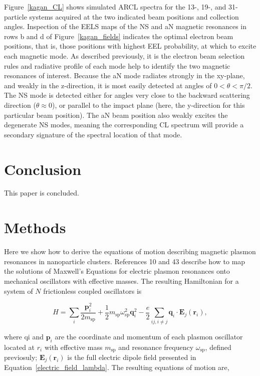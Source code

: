 \documentclass[journal=apchd5,manuscript=article]{achemso}
\begin{document}
Figure~\ref{kagan_CL} shows simulated ARCL spectra for the 13-, 19-, and 31-particle systems acquired at the two indicated beam positions and collection angles. Inspection of the EELS maps of the NS and aN magnetic resonances in rows b and d of Figure~\ref{kagan_fields} indicates the optimal electron beam positions, that is, those positions with highest EEL probability, at which to excite each magnetic mode. As described previously, it is the electron beam selection rules and radiative profile of each mode help to identify the two magnetic resonances of interest. Because the aN mode radiates strongly in the xy-plane, and weakly in the z-direction, it is most easily detected at angles of $0 < \theta < \pi/2$. The NS mode is detected either for angles very close to the backward scattering direction ($\theta \approx 0$), or parallel to the impact plane (here, the y-direction for this particular beam position). The aN beam position also weakly excites the degenerate NS modes, meaning the corresponding CL spectrum will provide a secondary signature of the spectral location of that mode.

\section{Conclusion}
This paper is concluded.

\section{Methods}
Here we show how to derive the equations of motion describing magnetic plasmon resonances in nanoparticle clusters. References 10 and 43 describe how to map the solutions of Maxwell's Equations for electric plasmon resonances onto mechanical oscillators with effective masses. The resulting Hamiltonian for a system of $N$ frictionless coupled oscillators is

\begin{equation}
H = \sum_{i}\frac{\textbf{p}_i^2}{2m_{\textrm{sp}}}+\frac{1}{2}m_{\textrm{sp}}\omega_{\textrm{sp}}^2\textbf{q}_i^2 - \frac{e}{2}\sum_{ij,i\neq j}\textbf{q}_i\cdot\textbf{E}_j(\textbf{r}_i),
\label{hammy}
\end{equation}

\noindent where qi and $\textbf{p}_i$ are the coordinate and momentum of each plasmon oscillator located at $r_i$ with effective mass $m_{\textrm{sp}}$ and resonance frequency $\omega_{\textrm{sp}}$, defined previosuly; $\textbf{E}_j(\textbf{r}_i)$ is the full electric dipole field presented in Equation~\ref{electric_field_lambda}. The resulting equations of motion are,
\end{document}
